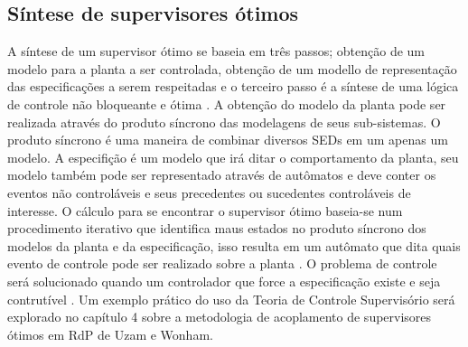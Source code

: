 \subsection{S\'intese de supervisores \'otimos}
A s\'intese de um supervisor \'otimo se baseia em tr\^es passos; obten\c{c}\~ao de um modelo para a planta a ser controlada, obten\c{c}\~ao de um modello de representa\c{c}\~ao das especifica\c{c}\~oes a serem respeitadas e o terceiro passo \'e a s\'intese de uma l\'ogica de controle n\~ao bloqueante e \'otima \cite{apostilacury}.
A obten\c{c}\~ao do modelo da planta pode ser realizada atrav\'es do produto s\'incrono das modelagens de seus sub-sistemas. O produto s\'incrono \'e uma maneira de combinar diversos SEDs em um apenas um modelo. A especifi\c{c}\~ao \'e um modelo que ir\'a ditar o comportamento da planta, seu modelo tamb\'em pode ser representado atrav\'es de aut\^omatos e deve conter os eventos n\~ao control\'aveis e seus precedentes ou sucedentes control\'aveis de interesse. 
O c\'alculo para se encontrar o supervisor \'otimo baseia-se num procedimento iterativo que identifica maus estados no produto s\'incrono dos modelos da planta e da especifica\c{c}\~ao, isso resulta em um aut\^omato que dita quais evento de controle pode ser realizado sobre a planta \cite{apostilacury}.
O problema de controle ser\'a solucionado quando um controlador que force a especifica\c{c}\~ao existe e seja contrut\'ivel \cite{WonhamCai2018}. Um exemplo pr\'atico do uso da Teoria de Controle Supervis\'orio ser\'a explorado no cap\'itulo 4 sobre a metodologia de acoplamento de supervisores \'otimos em RdP de Uzam e Wonham.

